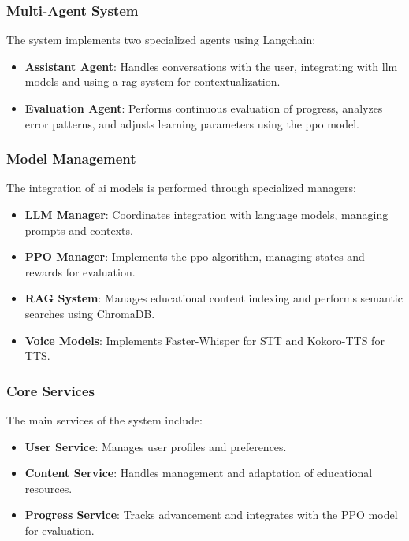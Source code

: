 \subsubsection{Multi-Agent System}
\label{sistema-multi-agente}

The system implements two specialized agents using Langchain:

\begin{itemize}
    \item \textbf{Assistant Agent}: Handles conversations with the user, integrating with \gls{llm} models and using a \gls{rag} system for contextualization.
    
    \item \textbf{Evaluation Agent}: Performs continuous evaluation of progress, analyzes error patterns, and adjusts learning parameters using the \gls{ppo} model.
\end{itemize}

\subsubsection{Model Management}
\label{gestion-modelos}

The integration of \gls{ai} models is performed through specialized managers:

\begin{itemize}
    \item \textbf{LLM Manager}: Coordinates integration with language models, managing prompts and contexts.
    
    \item \textbf{PPO Manager}: Implements the \gls{ppo} algorithm, managing states and rewards for evaluation.
    
    \item \textbf{RAG System}: Manages educational content indexing and performs semantic searches using ChromaDB.
    
    \item \textbf{Voice Models}: Implements Faster-Whisper for STT and Kokoro-TTS for TTS.
\end{itemize}

\subsubsection{Core Services}
\label{servicios-core}

The main services of the system include:

\begin{itemize}
    \item \textbf{User Service}: Manages user profiles and preferences.
    
    \item \textbf{Content Service}: Handles management and adaptation of educational resources.
    
    \item \textbf{Progress Service}: Tracks advancement and integrates with the PPO model for evaluation.
\end{itemize}

